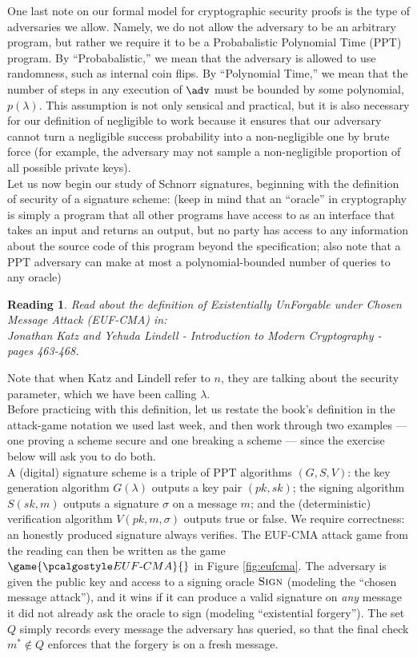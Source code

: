 \documentclass[12pt]{article}
\newtheorem{reading}{Reading}
\theoremstyle{definition}
\theoremstyle{remark}
\theoremstyle{definition}
\begin{document}
One last note on our formal model for cryptographic security proofs is the type of adversaries we allow. Namely, we do not allow the adversary to be an arbitrary program, but rather we require it to be a Probabalistic Polynomial Time (PPT) program. By ``Probabalistic,'' we mean that the adversary is allowed to use randomness, such as internal coin flips. By ``Polynomial Time,'' we mean that the number of steps in any execution of $\adv$ must be bounded by some polynomial, $p(\lambda)$. This assumption is not only sensical and practical, but it is also necessary for our definition of negligible to work because it ensures that our adversary cannot turn a negligible success probability into a non-negligible one by brute force (for example, the adversary may not sample a non-negligible proportion of all possible private keys).\\

Let us now begin our study of Schnorr signatures, beginning with the definition of security of a signature scheme: (keep in mind that an ``oracle'' in cryptography is simply a program that all other programs have access to as an interface that takes an input and returns an output, but no party has access to any information about the source code of this program beyond the specification; also note that a PPT adversary can make at most a polynomial-bounded number of queries to any oracle)

\begin{reading}
Read about the definition of Existentially UnForgable under Chosen Message Attack (EUF-CMA) in:\\
Jonathan Katz and Yehuda Lindell - Introduction to Modern Cryptography - pages 463-468.
\end{reading}

Note that when Katz and Lindell refer to $n$, they are talking about the security parameter, which we have been calling $\lambda$.\\

Before practicing with this definition, let us restate the book's definition in the attack-game notation we used last week, and then work through two examples --- one proving a scheme secure and one breaking a scheme --- since the exercise below will ask you to do both.\\

A (digital) signature scheme is a triple of PPT algorithms $(G, S, V)$: the key generation algorithm $G(\lambda)$ outputs a key pair $(pk, sk)$; the signing algorithm $S(sk, m)$ outputs a signature $\sigma$ on a message $m$; and the (deterministic) verification algorithm $V(pk, m, \sigma)$ outputs true or false. We require correctness: an honestly produced signature always verifies. The EUF-CMA attack game from the reading can then be written as the game $\game{\algo{EUF\text{-}CMA}}{}$ in Figure \ref{fig:eufcma}. The adversary is given the public key and access to a signing oracle ${\normalfont\textsc{Sign}}$ (modeling the ``chosen message attack''), and it wins if it can produce a valid signature on \emph{any} message it did not already ask the oracle to sign (modeling ``existential forgery''). The set $Q$ simply records every message the adversary has queried, so that the final check $m^*\notin Q$ enforces that the forgery is on a fresh message.
\end{document}
